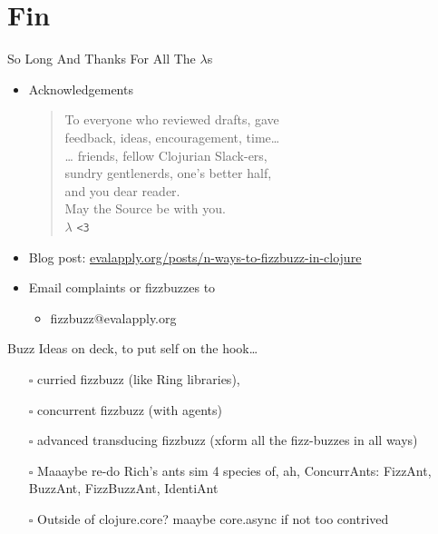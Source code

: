 \documentclass[presentation]{beamer}
\begin{document}
\section{Fin}
\label{sec:orga1c7f74}
\begin{frame}[label={sec:orgbdcbc83},fragile]{So Long And Thanks For All The \(\lambda\)s}
 \begin{itemize}
\item Acknowledgements
\begin{verse}
To everyone who reviewed drafts, gave\\
feedback, ideas, encouragement, time\ldots{}\\
\ldots{} friends, fellow Clojurian Slack-ers,\\
sundry gentlenerds, one's better half,\\
and you dear reader.\\
\vspace*{1em}
May the Source be with you.\\
\vspace*{1em}
\(\lambda\) \texttt{<3}\\
\end{verse}
\item Blog post: \uline{\href{https://www.evalapply.org/posts/n-ways-to-fizzbuzz-in-clojure/}{evalapply.org/posts/n-ways-to-fizzbuzz-in-clojure}}
\item Email complaints or fizzbuzzes to
\begin{itemize}
\item fizzbuzz@evalapply.org
\end{itemize}
\end{itemize}
\end{frame}
\begin{frame}[label={sec:org5b1e96f}]{Buzz}
Ideas on deck, to put self on the hook\ldots{}

\begin{itemize}
\item[{$\square$}] curried fizzbuzz (like Ring libraries),

\item[{$\square$}] concurrent fizzbuzz (with agents)

\item[{$\square$}] advanced transducing fizzbuzz
(xform all the fizz-buzzes in all ways)

\item[{$\square$}] Maaaybe re-do Rich's ants sim
4 species of, ah, ConcurrAnts:
FizzAnt, BuzzAnt, FizzBuzzAnt, IdentiAnt

\item[{$\square$}] Outside of clojure.core?
maaybe core.async if not too contrived
\end{itemize}
\end{frame}
\end{document}
